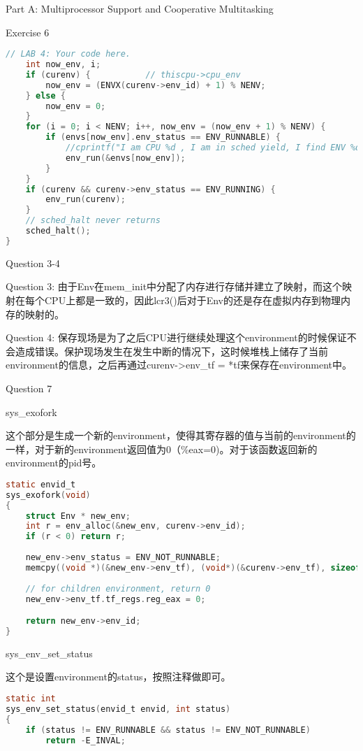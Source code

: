 \documentclass[GBK,winfonts,a4paper,10pt]{ctexart}
\begin{document}
\begin{section}{Part A: Multiprocessor Support and Cooperative Multitasking}
\begin{subsection}{Exercise 6}
\begin{lstlisting}[language=C]
	// LAB 4: Your code here.
	int now_env, i;
	if (curenv) {			// thiscpu->cpu_env
		now_env = (ENVX(curenv->env_id) + 1) % NENV;
	} else {
		now_env = 0;
	}
	for (i = 0; i < NENV; i++, now_env = (now_env + 1) % NENV) {
		if (envs[now_env].env_status == ENV_RUNNABLE) {
			//cprintf("I am CPU %d , I am in sched yield, I find ENV %d\n", thiscpu->cpu_id, now_env);
			env_run(&envs[now_env]);
		}
	}
	if (curenv && curenv->env_status == ENV_RUNNING) {
		env_run(curenv);
	}
	// sched_halt never returns
	sched_halt();
}
\end{lstlisting}
\end{subsection}

\begin{subsection}{Question 3-4}
\par
Question 3: 由于Env在mem\_init中分配了内存进行存储并建立了映射，而这个映射在每个CPU上都是一致的，因此lcr3()后对于Env的还是存在虚拟内存到物理内存的映射的。
\par
Question 4: 保存现场是为了之后CPU进行继续处理这个environment的时候保证不会造成错误。保护现场发生在发生中断的情况下，这时候堆栈上储存了当前environment的信息，之后再通过curenv->env\_tf = *tf来保存在environment中。
\end{subsection}


\begin{subsection}{Question 7}
\begin{subsubsection}{sys\_exofork}
\par
这个部分是生成一个新的environment，使得其寄存器的值与当前的environment的一样，对于新的environment返回值为0（\%eax=0)。对于该函数返回新的environment的pid号。
\begin{lstlisting}[language=C]
static envid_t
sys_exofork(void)
{
	struct Env * new_env;
	int r = env_alloc(&new_env, curenv->env_id);
	if (r < 0) return r;
	
	new_env->env_status = ENV_NOT_RUNNABLE;
	memcpy((void *)(&new_env->env_tf), (void*)(&curenv->env_tf), sizeof(struct Trapframe));
	
	// for children environment, return 0
	new_env->env_tf.tf_regs.reg_eax = 0;

	return new_env->env_id;
}
\end{lstlisting}
\end{subsubsection}

\begin{subsubsection}{sys\_env\_set\_status}
\par
这个是设置environment的status，按照注释做即可。
\begin{lstlisting}[language=C]
static int
sys_env_set_status(envid_t envid, int status)
{
	if (status != ENV_RUNNABLE && status != ENV_NOT_RUNNABLE) 
		return -E_INVAL;


\end{lstlisting}
\end{subsubsection}
\end{subsection}
\end{section}
\end{document}
